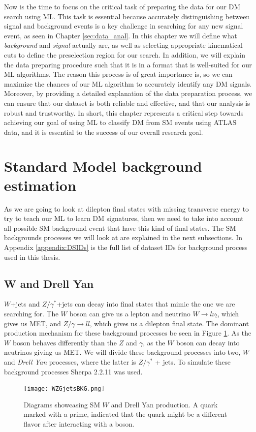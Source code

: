 \documentclass[12pt, a4paper]{book}
\begin{document}
Now is the time to focus on the critical task of preparing the data for our DM search using ML. This task is essential because accurately distinguishing between signal and background events is a key challenge in searching for any new signal event, 
as seen in Chapter \ref{sec:data_anal}. In this chapter we will define what \textit{background} and \textit{signal} actually are, as well as selecting appropriate kinematical cuts to define the preselection region for our search. In addition, we will 
explain the data preparing procedure such that it is in a format that is well-suited for our ML algorithms. The reason this process is of great importance is, so we can maximize the chances of our ML algorithm to accurately identify any DM signals. 
Moreover, by providing a detailed explanation of the data preparation process, we can ensure that our dataset is both reliable and effective, and that our analysis is robust and trustworthy. In short, this chapter represents a critical step towards 
achieving our goal of using ML to classify DM from SM events using ATLAS data, and it is essential to the success of our overall research goal.



\clearpage
\section{Standard Model background estimation}\label{sec:SM_bkgs}
As we are going to look at dilepton final states with missing transverse energy to try to teach our ML to learn DM signatures, then we need to take into account all possible SM background event that have this kind of final states. The SM backgrounds processes we will look at are explained in the next subsections. 
In Appendix \ref{appendix:DSIDs} is the full list of dataset IDs for background process used in this thesis.

\subsection{W and Drell Yan}
$W$+jets and $Z/\gamma^*$+jets can decay into final states that mimic the one we are searching for. The $W$ boson can give us a lepton and neutrino $W\rightarrow l\nu_l$, which gives us MET, and $Z/\gamma\rightarrow ll$, which gives us a dilepton final state. 
The dominant production mechanism for these background processes be seen in Figure \ref{fig:WZG_BKG}. As the $W$ boson behaves differently than the $Z$ and $\gamma$, as the $W$ boson can decay into neutrinos giving us MET. 
We will divide these background processes into two, $W$ and \textit{Drell Yan} processes, where the latter is $Z/\gamma^*$ + jets. To simulate these background processes Sherpa 2.2.11 \cite{Sherpa} was used.
\graphicspath{{../../figures/}}
\begin{figure}[!ht]
    \centering
    \texttt{[image: WZGjetsBKG.png]}
    \caption[$W$ and Drell Yan production]{Diagrams showcasing SM $W$ and Drell Yan production. A quark marked with a prime, indicated that the quark might be a different flavor after interacting with a boson.}\label{fig:WZG_BKG}
\end{figure}
\end{document}

